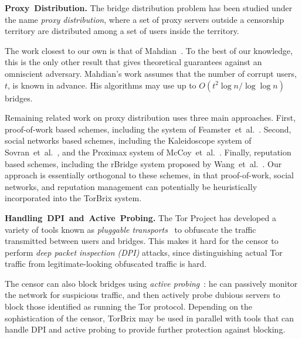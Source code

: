 \documentclass[letterpaper,twocolumn,10pt]{article}
\newcommand{\etal}{et~al.}
\newcommand{\sfsize}{\fontsize{0.73\baselineskip}{0.73\baselineskip}\selectfont}
\newcommand{\sans}[1]{\textsf{\sfsize \mbox{#1}}}
\newcommand{\sansb}[1]{\textbf{\sans{\mbox{#1}}}}
\newcommand{\para}[1]{\vspace{0.55em} \noindent \sansb{{\mbox{#1}}}}
\newcommand{\brix}{\sans{TorBrix}\xspace}
\begin{document}
\para{Proxy Distribution.} The bridge distribution problem has been studied under the name \emph{proxy distribution}, where a set of proxy servers outside a censorship territory are distributed among a set of users inside the territory. %

The work closest to our own is that of Mahdian~\cite{Mahdian:2010}.  To the best of our knowledge, this is the only other result that gives theoretical guarantees against an omniscient adversary.  Mahdian's work assumes that the number of corrupt users, $t$, is known in advance. His algorithms may use up to ${O(t^2 \log{n} / \log{\log{n}})}$ bridges.

Remaining related work on proxy distribution uses three main approaches.  First, proof-of-work based schemes, including the system of Feamster~\etal~\cite{Feamster:PETS:2003}.  Second, social networks based schemes, including the Kaleidoscope system of Sovran~\etal~\cite{Sovran:2008:PSN}, and the Proximax system of McCoy~\etal~\cite{McCoy:FC:2011}.  Finally, reputation based schemes, including the rBridge system proposed by Wang~\etal~\cite{WangLBH:rBridge:13}.  Our approach is essentially orthogonal to these schemes, in that proof-of-work, social networks, and reputation management can potentially be heuristically incorporated into the \brix system.


\para{Handling DPI and Active Probing.} The Tor Project has developed a variety of tools known as \emph{pluggable transports}~\cite{Tor:PluggableTransport} to obfuscate the traffic transmitted between users and bridges. This makes it hard for the censor to perform \emph{deep packet inspection (DPI)} attacks, since distinguishing actual Tor traffic from legitimate-looking obfuscated traffic is hard.

The censor can also block bridges using \emph{active probing}~\cite{Ensafi2015b}: he can passively monitor the network for suspicious traffic, and then actively probe dubious servers to block those identified as running the Tor protocol.
Depending on the sophistication of the censor, \brix may be used in parallel with tools that can handle DPI and active probing to provide further protection against blocking.
\end{document}
